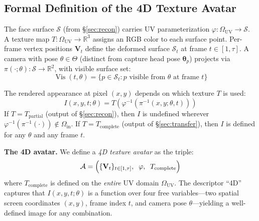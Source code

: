 \documentclass[conference]{IEEEtran}
\newcommand{\R}{\mathbb{R}}
\newcommand{\OUV}{\Omega_{\text{UV}}}
\newcommand{\Oin}{\Omega_{\text{in}}}
\newcommand{\Vis}{\operatorname{Vis}}
\newcommand{\Tpartial}{T_{\text{partial}}}
\newcommand{\Tcomplete}{T_{\text{complete}}}
\newcommand{\cA}{\mathcal{A}}       %
\begin{document}
\subsection{Formal Definition of the 4D Texture Avatar}

The face surface $\mathcal{S}$ (from §\ref{sec:recon}) carries UV parameterization
$\varphi\colon \OUV \to \mathcal{S}$. A texture map $T\colon \OUV \to \R^3$ assigns
an RGB color to each surface point. Per-frame vertex positions $\mathbf{V}_t$ define
the deformed surface $\mathcal{S}_t$ at frame $t \in [1,\tau]$. A camera with pose
$\theta \in \Theta$ (distinct from capture head pose $\bm{\theta}_p$) projects via
$\pi(\cdot;\theta)\colon \mathcal{S} \to \R^2$, with visible surface set:
\begin{equation}
  \Vis(t,\theta) = \bigl\{p \in \mathcal{S}_t :
    p \text{ visible from } \theta \text{ at frame } t\bigr\}
  \label{eq:vis_def}
\end{equation}

The rendered appearance at pixel $(x,y)$ depends on which texture $T$ is used:
\begin{equation}
  I(x,y,t;\theta) = T\!\left(\varphi^{-1}\!\left(\pi^{-1}(x,y;\theta,t)\right)\right)
  \label{eq:rendered_appearance}
\end{equation}
If $T = \Tpartial$ (output of §\ref{sec:recon}), then $I$ is undefined wherever
$\varphi^{-1}(\pi^{-1}(\cdot)) \notin \Oin$. If $T = \Tcomplete$ (output of
§\ref{sec:transfer}), then $I$ is defined for any $\theta$ and any frame $t$.

\medskip\noindent\textbf{The 4D avatar.}
We define a \emph{4D texture avatar} as the triple:
\begin{equation}
  \cA = \Bigl(\{\mathbf{V}_t\}_{t \in [1,\tau]},\;\; \varphi,\;\; \Tcomplete\Bigr)
  \label{eq:4d_avatar}
\end{equation}
where $\Tcomplete$ is defined on the \emph{entire} UV domain $\OUV$. The descriptor
``4D'' captures that $I(x, y, t; \theta)$ is a function over four free
variables---two spatial screen coordinates $(x, y)$, frame index $t$, and
camera pose $\theta$---yielding a well-defined image for any combination.
\end{document}
